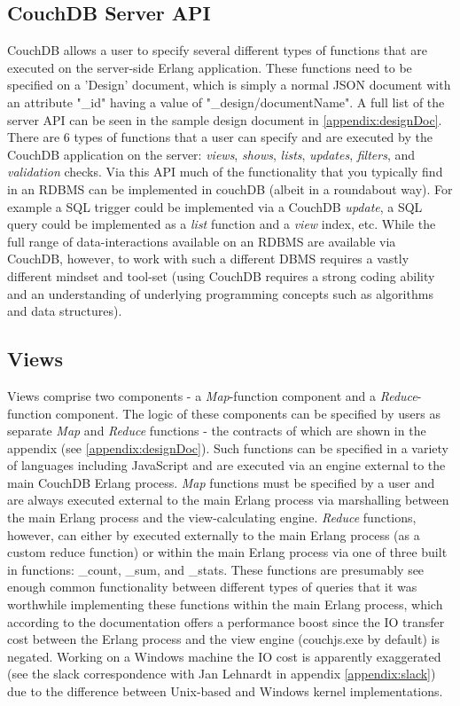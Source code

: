 \subsection{CouchDB Server API}
CouchDB allows a user to specify several different types of functions that are executed on the server-side Erlang application. These functions need to be specified on a 'Design' document, which is simply a normal JSON document with an attribute "\_id" having a value of "\_design/documentName". A full list of the server API can be seen in the sample design document in \ref{appendix:designDoc}. There are 6 types of functions that a user can specify and are executed by the CouchDB application on the server: \textit{views}, \textit{shows}, \textit{lists}, \textit{updates}, \textit{filters}, and \textit{validation} checks. Via this API much of the functionality that you typically find in an RDBMS can be implemented in couchDB (albeit in a roundabout way). For example a SQL trigger could be implemented via a CouchDB \textit{update}, a SQL query could be implemented as a \textit{list} function and a \textit{view} index, etc. While the full range of data-interactions available on an RDBMS are available via CouchDB, however, to work with such a different DBMS requires a vastly different mindset and tool-set (using CouchDB requires a strong coding ability and an understanding of underlying programming concepts such as algorithms and data structures).

\subsection{Views}
Views comprise two components - a \textit{Map}-function component and a \textit{Reduce}-function component. The logic of these components can be specified by users as separate \textit{Map} and \textit{Reduce} functions - the contracts of which are shown in the appendix (see \ref{appendix:designDoc}). Such functions can be specified in a variety of languages including JavaScript and are executed via an engine external to the main CouchDB Erlang process. \textit{Map} functions must be specified by a user and are always executed external to the main Erlang process via marshalling between the main Erlang process and the view-calculating engine. \textit{Reduce} functions, however, can either by executed externally to the main Erlang process (as a custom reduce function) or within the main Erlang process via one of three built in functions: \_count, \_sum, and \_stats. These functions are presumably see enough common functionality between different types of queries that it was worthwhile implementing these functions within the main Erlang process, which according to the documentation offers a performance boost since the IO transfer cost between the Erlang process and the view engine (couchjs.exe by default) is negated. Working on a Windows machine the IO cost is apparently exaggerated (see the slack correspondence with Jan Lehnardt in appendix \ref{appendix:slack}) due to the difference between Unix-based and Windows kernel implementations.

